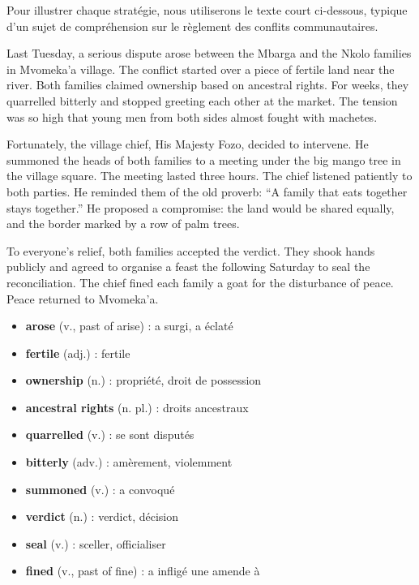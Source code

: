 \documentclass[11pt]{article}
\begin{document}
Pour illustrer chaque stratégie, nous utiliserons le texte court ci-dessous, typique d'un sujet de compréhension sur le règlement des conflits communautaires.

\begin{textebox}
Last Tuesday, a serious dispute arose between the Mbarga and the Nkolo families in Mvomeka'a village. The conflict started over a piece of fertile land near the river. Both families claimed ownership based on ancestral rights. For weeks, they quarrelled bitterly and stopped greeting each other at the market. The tension was so high that young men from both sides almost fought with machetes.

Fortunately, the village chief, His Majesty Fozo, decided to intervene. He summoned the heads of both families to a meeting under the big mango tree in the village square. The meeting lasted three hours. The chief listened patiently to both parties. He reminded them of the old proverb: “A family that eats together stays together.” He proposed a compromise: the land would be shared equally, and the border marked by a row of palm trees.

To everyone's relief, both families accepted the verdict. They shook hands publicly and agreed to organise a feast the following Saturday to seal the reconciliation. The chief fined each family a goat for the disturbance of peace. Peace returned to Mvomeka'a.
\end{textebox}

\begin{definition}
\begin{itemize}
    \item \textbf{arose} (v., past of arise) : a surgi, a éclaté
    \item \textbf{fertile} (adj.) : fertile
    \item \textbf{ownership} (n.) : propriété, droit de possession
    \item \textbf{ancestral rights} (n. pl.) : droits ancestraux
    \item \textbf{quarrelled} (v.) : se sont disputés
    \item \textbf{bitterly} (adv.) : amèrement, violemment
    \item \textbf{summoned} (v.) : a convoqué
    \item \textbf{verdict} (n.) : verdict, décision
    \item \textbf{seal} (v.) : sceller, officialiser
    \item \textbf{fined} (v., past of fine) : a infligé une amende à
\end{itemize}
\end{definition}
\end{document}
